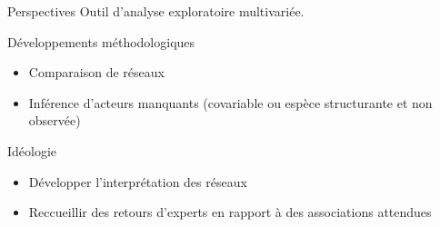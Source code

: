 \documentclass[11pt]{beamer}
\newcommand{\bleu}[1]{\textcolor{Framableulight}{#1}}
\begin{document}
\begin{frame}{Perspectives}
Outil d'analyse exploratoire multivariée.\\

\vspace{0.8cm}

\bleu{Développements méthodologiques}
\begin{itemize}
\item Comparaison de réseaux
\item Inférence d'acteurs manquants (covariable ou espèce structurante et non observée)
\end{itemize}


\bleu{Idéologie}
\begin{itemize}
\item Développer l'interprétation des réseaux
\item Reccueillir des retours d'experts en rapport à des associations attendues
\end{itemize}

\end{frame}
\end{document}
